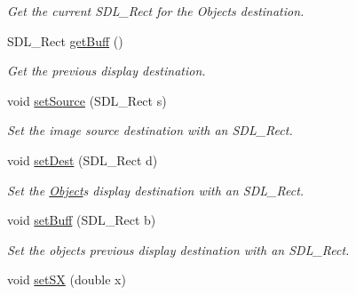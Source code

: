 \begin{DoxyCompactItemize}
\begin{DoxyCompactList}\small\item\em Get the current S\+D\+L\+\_\+\+Rect for the Objects destination. \end{DoxyCompactList}\item 
S\+D\+L\+\_\+\+Rect \hyperlink{classObject_ad6363cce8614921f01b9ed9c1e068f65}{get\+Buff} ()\hypertarget{classObject_ad6363cce8614921f01b9ed9c1e068f65}{}\label{classObject_ad6363cce8614921f01b9ed9c1e068f65}

\begin{DoxyCompactList}\small\item\em Get the previous display destination. \end{DoxyCompactList}\item 
void \hyperlink{classObject_ab53b92a384c274bc1805eb50617d5117}{set\+Source} (S\+D\+L\+\_\+\+Rect s)\hypertarget{classObject_ab53b92a384c274bc1805eb50617d5117}{}\label{classObject_ab53b92a384c274bc1805eb50617d5117}

\begin{DoxyCompactList}\small\item\em Set the image source destination with an S\+D\+L\+\_\+\+Rect. \end{DoxyCompactList}\item 
void \hyperlink{classObject_a0edcf4141d5f6b86337597ecac4f8df2}{set\+Dest} (S\+D\+L\+\_\+\+Rect d)\hypertarget{classObject_a0edcf4141d5f6b86337597ecac4f8df2}{}\label{classObject_a0edcf4141d5f6b86337597ecac4f8df2}

\begin{DoxyCompactList}\small\item\em Set the \hyperlink{classObject}{Object}\textquotesingle{}s display destination with an S\+D\+L\+\_\+\+Rect. \end{DoxyCompactList}\item 
void \hyperlink{classObject_aa4a5d9d35931d9a0ad47557c3ca23ac7}{set\+Buff} (S\+D\+L\+\_\+\+Rect b)\hypertarget{classObject_aa4a5d9d35931d9a0ad47557c3ca23ac7}{}\label{classObject_aa4a5d9d35931d9a0ad47557c3ca23ac7}

\begin{DoxyCompactList}\small\item\em Set the object\textquotesingle{}s previous display destination with an S\+D\+L\+\_\+\+Rect. \end{DoxyCompactList}\item 
void \hyperlink{classObject_a63266f7fbaade4768bf6d60d0b313508}{set\+SX} (double x)\hypertarget{classObject_a63266f7fbaade4768bf6d60d0b313508}{}\label{classObject_a63266f7fbaade4768bf6d60d0b313508}


\end{DoxyCompactItemize}
